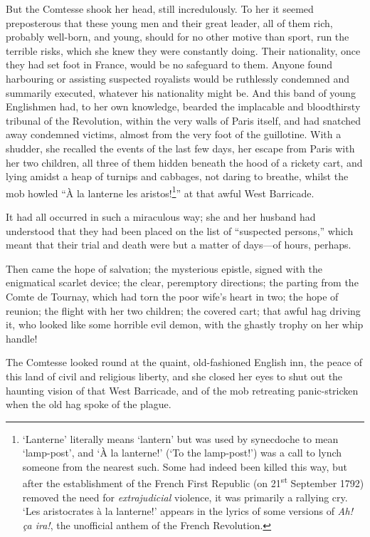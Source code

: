 But the Comtesse shook her head, still incredulously. To her it seemed preposterous that these young men and their great leader, all of them rich, probably well-born, and young, should for no other motive than sport, run the terrible risks, which she knew they were constantly doing. Their nationality, once they had set foot in France, would be no safeguard to them. Anyone found harbouring or assisting suspected royalists would be ruthlessly condemned and summarily executed, whatever his nationality might be. And this band of young Englishmen had, to her own knowledge, bearded the implacable and bloodthirsty tribunal of the Revolution, within the very walls of Paris itself, and had snatched away condemned victims, almost from the very foot of the guillotine. With a shudder, she recalled the events of the last few days, her escape from Paris with her two children, all three of them hidden beneath the hood of a rickety cart, and lying amidst a heap of turnips and cabbages, not daring to breathe, whilst the mob howled \enquote{À la lanterne les aristos!\footnote{\enquote{Lanterne} literally means \enquote{lantern} but was used by synecdoche to mean  \enquote{lamp-post}, and \enquote{À la lanterne!} (\enquote{To the lamp-post!}) was a call to lynch someone from the nearest such. Some had indeed been killed this way, but after the establishment of the French First Republic (on 21\textsuperscript{st} September 1792) removed the need for \textit{extrajudicial} violence, it was primarily a rallying cry. \enquote{Les aristocrates à la lanterne!} appears in the lyrics of some versions of \textit{Ah! ça ira!}, the unofficial anthem of the French Revolution.}} at that awful West Barricade.

It had all occurred in such a miraculous way; she and her husband had understood that they had been placed on the list of \enquote{suspected persons,} which meant that their trial and death were but a matter of days---of hours, perhaps.

Then came the hope of salvation; the mysterious epistle, signed with the enigmatical scarlet device; the clear, peremptory directions; the parting from the Comte de Tournay, which had torn the poor wife's heart in two; the hope of reunion; the flight with her two children; the covered cart; that awful hag driving it, who looked like some horrible evil demon, with the ghastly trophy on her whip handle!

The Comtesse looked round at the quaint, old-fashioned English inn, the peace of this land of civil and religious liberty, and she closed her eyes to shut out the haunting vision of that West Barricade, and of the mob retreating panic-stricken when the old hag spoke of the plague.

